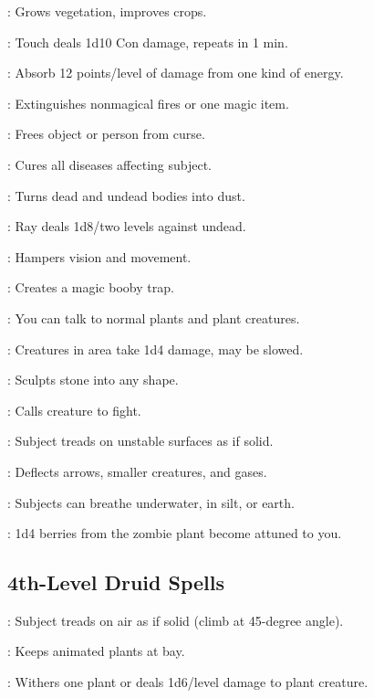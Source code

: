 : Grows vegetation, improves crops.

: Touch deals 1d10 Con damage, repeats in 1 min.

: Absorb 12 points/level of damage from one kind of energy.

: Extinguishes nonmagical fires or one magic item.

: Frees object or person from curse.

: Cures all diseases affecting subject.

: Turns dead and undead bodies into dust.

: Ray deals 1d8/two levels against undead.

: Hampers vision and movement.

: Creates a magic booby trap.

: You can talk to normal plants and plant creatures.

: Creatures in area take 1d4 damage, may be slowed.

: Sculpts stone into any shape.

: Calls creature to fight.

: Subject treads on unstable surfaces as if solid.


: Deflects arrows, smaller creatures, and gases.

: Subjects can breathe underwater, in silt, or earth.

: 1d4 berries from the zombie plant become attuned to you.



\subsection{4th-Level Druid Spells}

: Subject treads on air as if solid (climb at 45-degree angle).

: Keeps animated plants at bay.

: Withers one plant or deals 1d6/level damage to plant creature.

